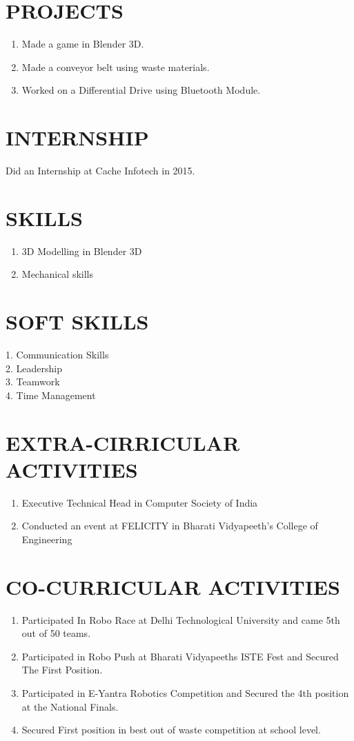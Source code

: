 \documentclass{article}
\begin{document}
\section{PROJECTS}
\Large
\begin{enumerate}
\item Made a game in Blender 3D. 
\item Made a conveyor belt using waste materials.
\item Worked on a Differential Drive using Bluetooth Module.
\end{enumerate}

\section{INTERNSHIP}
Did an Internship at Cache Infotech in 2015.

\section{SKILLS}
\begin{enumerate}
\item 3D Modelling in Blender 3D
\item Mechanical skills
\end{enumerate}

\section{SOFT SKILLS}
1. Communication Skills\\
2. Leadership\\
3. Teamwork\\
4. Time Management

\section{EXTRA-CIRRICULAR ACTIVITIES}
\begin{enumerate}
\item Executive Technical Head in Computer Society of India
\item Conducted an event at FELICITY in Bharati Vidyapeeth's College of Engineering
\end{enumerate}

\section{CO-CURRICULAR ACTIVITIES}
\begin{enumerate}
\item Participated In Robo Race at Delhi Technological University and came 5th out of 50 teams.
\item Participated in Robo Push at Bharati Vidyapeeths ISTE Fest and Secured The First Position.
\item Participated in E-Yantra Robotics Competition and Secured the 4th position at the National Finals.
\item Secured First position in best out of waste competition at school level.
\end{enumerate}
\end{document}

